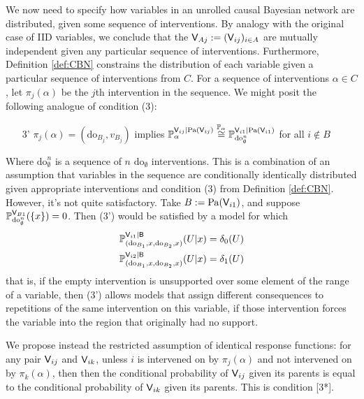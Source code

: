 We now need to specify how variables in an unrolled causal Bayesian network are distributed, given some sequence of interventions. By analogy with the original case of IID variables, we conclude that the $\mathsf{V}_{Aj}:=(\mathsf{V}_{ij})_{i\in A}$ are mutually independent given any particular sequence of interventions. Furthermore, Definition \ref{def:CBN} constrains the distribution of each variable given a particular sequence of interventions from $C$. For a sequence of interventions $\alpha\in C$, let $\pi_j(\alpha)$ be the $j$th intervention in the sequence. We might posit the following analogue of condition (3): 
\begin{itemize}
    \item [3'] $\pi_j(\alpha)=(\mathrm{do}_{B_j},v_{B_j})$ implies $\mathbb{P}_{\alpha}^{\mathsf{V}_{ij}|\mathrm{Pa}(\mathsf{V}_{ij})}\overset{\mathbb{P}_{\alpha}}{\cong}\mathbb{P}_{\mathrm{do}_{\emptyset}^n}^{\mathsf{V}_{i1}|\mathrm{Pa}(\mathsf{V}_{i1})}$ for all $i\not\in B$
\end{itemize}
Where $\mathrm{do}_{\emptyset}^n$ is a sequence of $n$ $\mathrm{do}_{\emptyset}$ interventions. This is a combination of an assumption that variables in the sequence are conditionally identically distributed given appropriate interventions and condition (3) from Definition \ref{def:CBN}. However, it's not quite satisfactory. Take $B:=\mathrm{Pa}(\mathsf{V}_{i1})$, and suppose $\mathbb{P}_{\mathrm{do}_{\emptyset}^n}^{\mathsf{V}_{B1}}(\{x\})=0$. Then (3') would be satisfied by a model for which
\begin{align}
    \mathbb{P}_{(\mathrm{do}_{B_1},x,\mathrm{do}_{B_2},x)}^{\mathsf{V}_{i1}|\mathsf{B}}(U|x) &= \delta_0(U)\\
    \mathbb{P}_{(\mathrm{do}_{B_1},x,\mathrm{do}_{B_2},x)}^{\mathsf{V}_{i2}|\mathsf{B}}(U|x) &= \delta_1(U)
\end{align}
that is, if the empty intervention is unsupported over some element of the range of a variable, then (3') allows models that assign different consequences to repetitions of the same intervention on this variable, if those intervention forces the variable into the region that originally had no support.

We propose instead the restricted assumption of identical response functions: for any pair $\mathsf{V}_{ij}$ and $\mathsf{V}_{ik}$, unless $i$ is intervened on by $\pi_j(\alpha)$ and not intervened on by $\pi_{k}(\alpha)$, then then the conditional probability of $\mathsf{V}_{ij}$ given its parents is equal to the conditional probability of $\mathsf{V}_{ik}$ given its parents. This is condition [3*].

